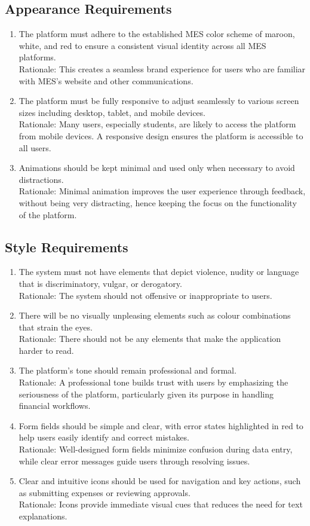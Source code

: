 \documentclass[12pt]{article}
\begin{document}
\subsection{Appearance Requirements}
\begin{enumerate}
  \item The platform must adhere to the established MES color scheme of maroon, white, and red to ensure a consistent visual identity across all MES platforms. \\
  Rationale: This creates a seamless brand experience for users who are familiar with MES's website and other communications.
  \item The platform must be fully responsive to adjust seamlessly to various screen sizes including desktop, tablet, and mobile devices. \\
  Rationale: Many users, especially students, are likely to access the platform from mobile devices. A responsive design ensures the platform is accessible to all users.
  \item  Animations should be kept minimal and used only when necessary to avoid distractions. \\
  Rationale: Minimal animation improves the user experience through feedback, without being very distracting, hence keeping the focus on the functionality of the platform.
\end{enumerate}
\subsection{Style Requirements}
\begin{enumerate}
  \item The system must not have elements that depict violence, nudity or language that is discriminatory, vulgar, or derogatory. \\ 
  Rationale: The system should not offensive or inappropriate to users.
  \item There will be no visually unpleasing elements such as colour combinations that strain the eyes. \\ 
  Rationale: There should not be any elements that make the application harder to read.
  \item The platform’s tone should remain professional and formal. \\
  Rationale: A professional tone builds trust with users by emphasizing the seriousness of the platform, particularly given its purpose in handling financial workflows.
  \item Form fields should be simple and clear, with error states highlighted in red to help users easily identify and correct mistakes. \\
  Rationale: Well-designed form fields minimize confusion during data entry, while clear error messages guide users through resolving issues.
  \item Clear and intuitive icons should be used for navigation and key actions, such as submitting expenses or reviewing approvals. \\
  Rationale: Icons provide immediate visual cues that reduces the need for text explanations.
\end{enumerate}
\end{document}
